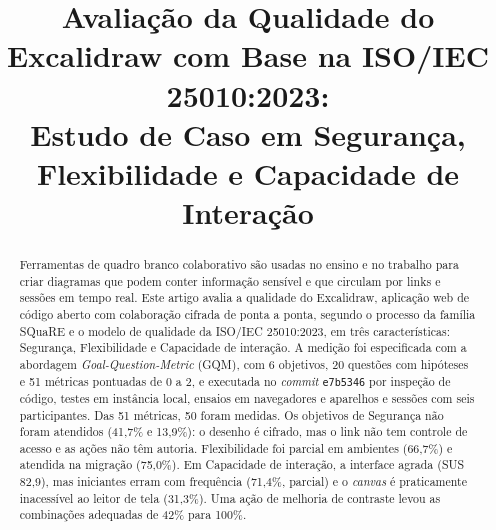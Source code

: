 \documentclass[conference]{IEEEtran}
\begin{document}
\title{Avaliação da Qualidade do Excalidraw com Base na ISO/IEC 25010:2023:\\
Estudo de Caso em Segurança, Flexibilidade e Capacidade de Interação}

\author{
\and
{}
\and
{}
\and
{}
\and
{}
\and
{}
}

\maketitle

\begin{abstract}
Ferramentas de quadro branco colaborativo são usadas no ensino e no trabalho
para criar diagramas que podem conter informação sensível e que circulam por
links e sessões em tempo real. Este artigo avalia a qualidade do Excalidraw,
aplicação web de código aberto com colaboração cifrada de ponta a ponta,
segundo o processo da família SQuaRE e o modelo de qualidade da
ISO/IEC 25010:2023, em três características: Segurança, Flexibilidade e
Capacidade de interação. A medição foi especificada com a abordagem
\textit{Goal-Question-Metric} (GQM), com 6 objetivos, 20 questões com
hipóteses e 51 métricas pontuadas de 0 a 2, e executada no \textit{commit}
\texttt{e7b5346} por inspeção de código, testes em instância local, ensaios
em navegadores e aparelhos e sessões com seis participantes. Das 51 métricas,
50 foram medidas. Os objetivos de Segurança não foram atendidos (41,7\% e
13,9\%): o desenho é cifrado, mas o link não tem controle de acesso e as
ações não têm autoria. Flexibilidade foi parcial em ambientes (66,7\%) e
atendida na migração (75,0\%). Em Capacidade de interação, a interface agrada
(SUS 82,9), mas iniciantes erram com frequência (71,4\%, parcial) e o
\textit{canvas} é praticamente inacessível ao leitor de tela (31,3\%). Uma
ação de melhoria de contraste levou as combinações adequadas de 42\% para
100\%.
\end{abstract}
\end{document}
